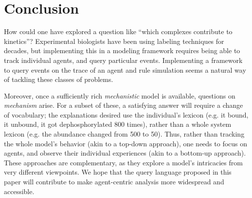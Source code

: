 \section{Conclusion}

How could one have explored a question like ``which complexes
contribute to kinetics''? Experimental biologists have been using
labeling techniques for decades, but implementing this in a modeling
framework requires being able to track individual agents, and query
particular events. Implementing a framework to query events on the
trace of an agent and rule simulation seems a natural way of tackling
these classes of problems.

Moreover, once a sufficiently rich
\emph{mechanistic} model is available, questions on \emph{mechanism}
arise. For a subset of these, a satisfying answer will require a
change of vocabulary; the explanations desired use the individual's
lexicon (e.g. it bound, it unbound, it got dephosphorylated 800
times), rather than a whole system lexicon (e.g. the abundance changed
from 500 to 50). Thus, rather than tracking the whole model's behavior
(akin to a top-down approach), one needs to focus on agents, and
observe their individual experiences (akin to a bottom-up
approach). These approaches are complementary, as they explore a
model's intricacies from very different viewpoints. We hope that the
query language proposed in this paper will contribute to make
agent-centric analysis more widespread and accessible.
